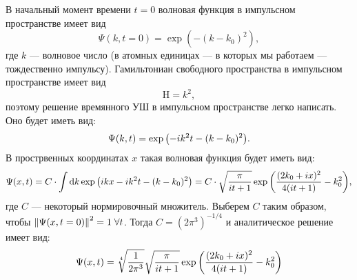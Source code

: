 \documentclass[10pt]{article}
\begin{document}
В начальный момент времени $t=0$ волновая функция в импульсном пространстве имеет вид $$\Psi(k,t=0) = \exp(-(k-k_0)^2),$$ где $k$ --- волновое число (в атомных единицах --- в которых мы работаем --- тождественно импульсу). Гамильтониан свободного пространства в импульсном пространстве имеет вид $$ \mathrm{H} = k^2,$$ поэтому решение времянного УШ в импульсном пространстве легко написать. Оно будет иметь вид:
\begin{equation}
 \Psi(k,t) =\exp\qty(-i k^2 t - (k-k_0)^2).
\end{equation}
В прострвенных координатах $x$ такая волновая функция будет иметь вид:
\begin{equation}
 \Psi(x,t) =  C \cdot \int \dd{k} \exp\qty(ikx -i k^2 t - (k-k_0)^2) = C \cdot \sqrt{\dfrac{\pi}{it+1}} \exp\qty(\dfrac{(2k_0 + ix)^2}{4(it+1)} - k_0^2),
\end{equation}
где $C$ --- некоторый нормировочный множитель. Выберем $C$ таким образом, чтобы $\norm{\Psi(x,t=0)}^2=1\; \forall t$. Тогда $C=(2\pi^3)^{-1/4}$ и аналитическое решение имеет вид:
\begin{equation}
 \Psi(x,t) = \sqrt[4]{\dfrac{1}{2\pi^3}} \sqrt{\dfrac{\pi}{it+1}} \exp\qty(\dfrac{(2k_0 + ix)^2}{4(it+1)} - k_0^2)
\end{equation}
\end{document}
